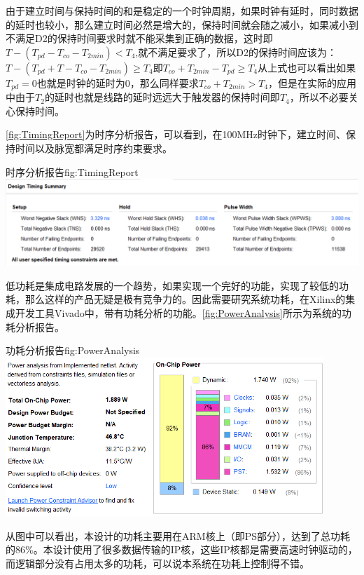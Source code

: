 \documentclass[supercite]{HustGraduPaper}
\begin{document}
	由于建立时间与保持时间的和是稳定的一个时钟周期，如果时钟有延时，同时数据的延时也较小，那么建立时间必然是增大的，保持时间就会随之减小，如果减小到不满足D2的保持时间要求时就不能采集到正确的数据，这时即$ T-(T_{pd}-T_{co}-T_{2min})< T_4 $,就不满足要求了，所以D2的保持时间应该为：$ T-(T_{pd}+T-T_{co}-T_{2min})\ge T_4 $即$ T_{co}+T_{2min} - T_{pd} \ge T_4 $从上式也可以看出如果$ T_{pd}=0 $也就是时钟的延时为0，那么同样要求$ T_{co}+T_{2min}>T_4 $，但是在实际的应用中由于$ T_2 $的延时也就是线路的延时远远大于触发器的保持时间即$ T_4 $，所以不必要关心保持时间。
	
	\autoref{fig:TimingReport}为时序分析报告，可以看到，在100MHz时钟下，建立时间、保持时间以及脉宽都满足时序约束要求。
	
	\begin{generalfig}[htb]{时序分析报告}{fig:TimingReport}
		\includegraphics[width=\textwidth]{Figures/TimingReport.png}
	\end{generalfig}
	
	
	低功耗是集成电路发展的一个趋势，如果实现一个完好的功能，实现了较低的功耗，那么这样的产品无疑是极有竞争力的。因此需要研究系统功耗，在Xilinx的集成开发工具Vivado中，带有功耗分析的功能。\autoref{fig:PowerAnalysis}所示为系统的功耗分析报告。
	
	\begin{generalfig}[htb]{功耗分析报告}{fig:PowerAnalysis}
		\includegraphics[width=12cm]{Figures/PowerAnalysis.png}
	\end{generalfig}
	
	从图中可以看出，本设计的功耗主要用在ARM核上（即PS部分），达到了总功耗的86\%。本设计使用了很多数据传输的IP核，这些IP核都是需要高速时钟驱动的，而逻辑部分没有占用太多的功耗，可以说本系统在功耗上控制得不错。
	
\end{document}
